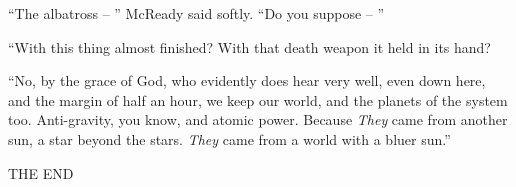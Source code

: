 \documentclass[letterpaper,openany,12pt]{memoir}		%
\begin{document}
``The albatross -- '' McReady said softly. ``Do you suppose -- ''

``With this thing almost finished? With that death weapon it held in its hand?

``No, by the grace of God, who evidently does hear very well, even down here,
and the margin of half an hour, we keep our world, and the planets of the system
too. Anti-gravity, you know, and atomic power. Because \emph{They} came from
another sun, a star beyond the stars. \emph{They} came from a world with a bluer
sun.''

\vspace{30pt}

\begin{center}
{\chaptertitles THE END}
\end{center}
\end{document}
